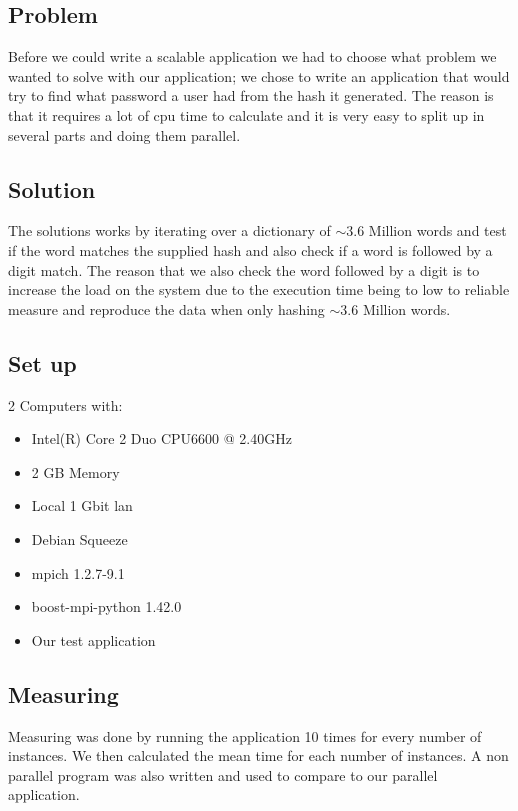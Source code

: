 \documentclass{article}
\begin{document}
\subsection{Problem}
Before we could write a scalable application we had to choose what problem we
wanted to solve with our application; we chose to write an application that
would try to find what password a user had from the hash it generated.
The reason is that it requires a lot of cpu time to calculate and it is 
very easy to split up in several parts and doing them parallel.

\subsection{Solution}
The solutions works by iterating over a dictionary of $\sim$3.6 Million words
and test if the word matches the supplied hash and also check if a word is
followed by a digit match. The reason that we also check the word followed by a
digit is to increase the load on the system due to the execution time being to
low to reliable measure and reproduce the data when only hashing $\sim$3.6
Million words.

\subsection{Set up}
2 Computers with:
\begin{itemize}
\item Intel(R) Core 2 Duo CPU6600  @ 2.40GHz
\item 2 GB Memory
\item Local 1 Gbit lan
\item Debian Squeeze
\item mpich 1.2.7-9.1
\item boost-mpi-python 1.42.0
\item Our test application \cite{pympi-test}
\end{itemize}

\subsection{Measuring}
Measuring was done by running the application 10 times for every number of
instances. We then calculated the mean time for each number of instances. A non
parallel program was also written and used to compare to our parallel
application.
\end{document}
